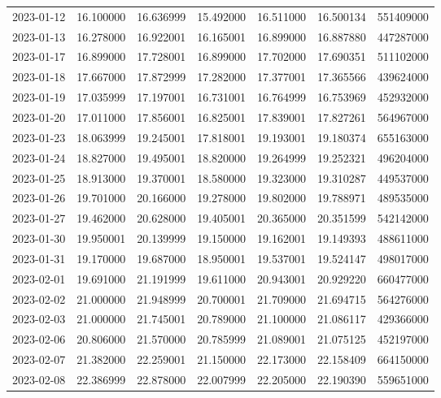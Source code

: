 \begin{tabular}{lrrrrrr}
2023-01-12 &   16.100000 &   16.636999 &   15.492000 &   16.511000 &   16.500134 &   551409000 \\
2023-01-13 &   16.278000 &   16.922001 &   16.165001 &   16.899000 &   16.887880 &   447287000 \\
2023-01-17 &   16.899000 &   17.728001 &   16.899000 &   17.702000 &   17.690351 &   511102000 \\
2023-01-18 &   17.667000 &   17.872999 &   17.282000 &   17.377001 &   17.365566 &   439624000 \\
2023-01-19 &   17.035999 &   17.197001 &   16.731001 &   16.764999 &   16.753969 &   452932000 \\
2023-01-20 &   17.011000 &   17.856001 &   16.825001 &   17.839001 &   17.827261 &   564967000 \\
2023-01-23 &   18.063999 &   19.245001 &   17.818001 &   19.193001 &   19.180374 &   655163000 \\
2023-01-24 &   18.827000 &   19.495001 &   18.820000 &   19.264999 &   19.252321 &   496204000 \\
2023-01-25 &   18.913000 &   19.370001 &   18.580000 &   19.323000 &   19.310287 &   449537000 \\
2023-01-26 &   19.701000 &   20.166000 &   19.278000 &   19.802000 &   19.788971 &   489535000 \\
2023-01-27 &   19.462000 &   20.628000 &   19.405001 &   20.365000 &   20.351599 &   542142000 \\
2023-01-30 &   19.950001 &   20.139999 &   19.150000 &   19.162001 &   19.149393 &   488611000 \\
2023-01-31 &   19.170000 &   19.687000 &   18.950001 &   19.537001 &   19.524147 &   498017000 \\
2023-02-01 &   19.691000 &   21.191999 &   19.611000 &   20.943001 &   20.929220 &   660477000 \\
2023-02-02 &   21.000000 &   21.948999 &   20.700001 &   21.709000 &   21.694715 &   564276000 \\
2023-02-03 &   21.000000 &   21.745001 &   20.789000 &   21.100000 &   21.086117 &   429366000 \\
2023-02-06 &   20.806000 &   21.570000 &   20.785999 &   21.089001 &   21.075125 &   452197000 \\
2023-02-07 &   21.382000 &   22.259001 &   21.150000 &   22.173000 &   22.158409 &   664150000 \\
2023-02-08 &   22.386999 &   22.878000 &   22.007999 &   22.205000 &   22.190390 &   559651000 \\

\end{tabular}

